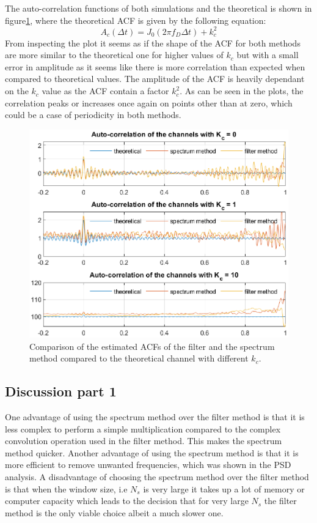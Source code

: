 \documentclass[conference]{IEEEtran}
\begin{document}
    
    The auto-correlation functions of both simulations and the theoretical is shown in figure\ref{acf}, where the theoretical ACF is given by the following equation:
    \begin{equation}
    A_c({\Delta}t) = J_0(2{\pi}f_D{\Delta}t) + k_c^2
    \label{eqn:acf}
    \end{equation}
    From inspecting the plot it seems as if the shape of the ACF for both methods are more similar to the theoretical one for higher values of $k_c$ but with a small error in amplitude as it seems like there is more correlation than expected when compared to theoretical values. The amplitude of the ACF is heavily dependant on the $k_c$ value as the ACF contain a factor $k_c^2$. As can be seen in the plots, the correlation peaks or increases once again on points other than at zero, which could be a case of periodicity in both methods.
    \begin{figure}[H]
        \centering
        \includegraphics[width = \linewidth]{Figures/ACF.eps}
        \caption{Comparison of the estimated ACFs of the filter and the spectrum method compared to the theoretical channel with different $k_{c}$.}
        \label{acf}
    \end{figure}
    
\subsection{Discussion part 1}

    One advantage of using the spectrum method over the filter method is that it is less complex to perform a simple multiplication compared to the complex convolution operation used in the filter method. This makes the spectrum method quicker. Another advantage of using the spectrum method is that it is more efficient to remove unwanted frequencies, which was shown in the PSD analysis. A disadvantage of choosing the spectrum method over the filter method is that when the window size, i.e $N_s$ is very large it takes up a lot of memory or computer capacity which leads to the decision that for very large $N_s$ the filter method is the only viable choice albeit a much slower one.
    
\end{document}
